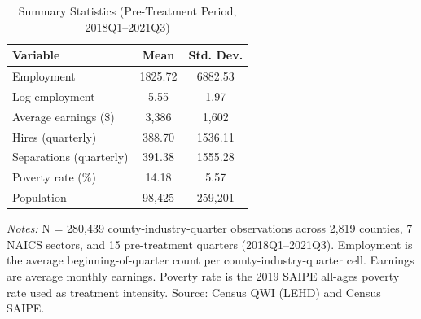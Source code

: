 \begin{table}[H]
\centering
\caption{Summary Statistics (Pre-Treatment Period, 2018Q1--2021Q3)}
\label{tab:summary}
\begin{threeparttable}
\begin{tabular}{lcc}
\toprule
Variable & Mean & Std. Dev. \\
\midrule
Employment & 1825.72 & 6882.53 \\
Log employment & 5.55 & 1.97 \\
Average earnings (\$) & 3,386 & 1,602 \\
Hires (quarterly) & 388.70 & 1536.11 \\
Separations (quarterly) & 391.38 & 1555.28 \\
Poverty rate (\%) & 14.18 & 5.57 \\
Population & 98,425 & 259,201 \\
\bottomrule
\end{tabular}
\begin{tablenotes}[flushleft]
\small
\item \textit{Notes:} N = 280,439 county-industry-quarter observations across 2,819 counties, 7 NAICS sectors, and 15 pre-treatment quarters (2018Q1--2021Q3). Employment is the average beginning-of-quarter count per county-industry-quarter cell. Earnings are average monthly earnings. Poverty rate is the 2019 SAIPE all-ages poverty rate used as treatment intensity. Source: Census QWI (LEHD) and Census SAIPE.
\end{tablenotes}
\end{threeparttable}
\end{table}
